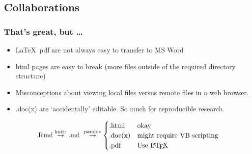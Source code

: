 \documentclass[t]{beamer}\usepackage[]{graphicx}\usepackage[]{color}
\begin{document}
\subsection{Collaborations}
\begin{frame}[fragile]
  \frametitle{That's great, but \ldots}

  \begin{itemize}
    \item \LaTeX\ pdf are not always easy to transfer to MS Word
    \item html pages are easy to break (more files outside of the required
      directory structure) 
    \item Misconceptions about viewing local files versus remote files in a web
      browser.
    \item .doc(x) are `accidentally' editable.  So much for reproducible
      research.
  \end{itemize}
  \[
  \text{.Rmd} \stackrel{\text{knitr}}{\rightarrow} 
  \text{.md } \stackrel{\text{pandoc}}{\rightarrow} 
  \begin{cases} 
        \text{.html} & \text{okay} \\
        \text{.doc(x)} & \text{might require VB scripting} \\
        \text{.pdf}  & \text{Use \LaTeX} 
      \end{cases}\]

\end{frame}

\end{document}

